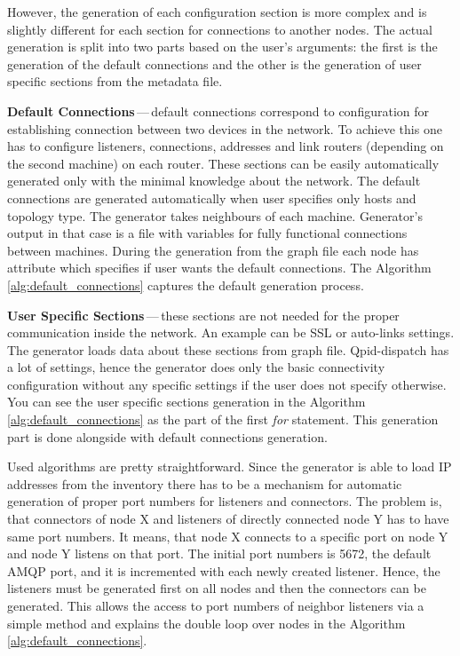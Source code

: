 However, the generation of each configuration section is more complex and is slightly different for each section for connections to another nodes. The actual generation is split into two parts based on the user's arguments: the first is the generation of the default connections and the other is the generation of user specific sections from the metadata file.

\begin{description}
	\item \textbf{Default Connections}\,---\,default connections correspond to configuration for establishing connection between two devices in the network. To achieve this one has to configure listeners, connections, addresses and link routers (depending on the second machine) on each router. These sections can be easily automatically generated only with the minimal knowledge about the network. The default connections are generated automatically when user specifies only hosts and topology type. The generator takes neighbours of each machine. Generator's output in that case is a file with variables for fully functional connections between machines. During the generation from the graph file each node has attribute which specifies if user wants the default connections. The Algorithm \ref{alg:default_connections} captures the default generation process.

	\item \textbf{User Specific Sections}\,---\,these sections are not needed for the proper communication inside the network. An example can be SSL or auto-links settings. The generator loads data about these sections from graph file. Qpid-dispatch has a lot of settings, hence the generator does only the basic connectivity configuration without any specific settings if the user does not specify otherwise. You can see the user specific sections generation in the Algorithm \ref{alg:default_connections} as the part of the first \emph{for} statement. This generation part is done alongside with default connections generation.

\end{description}

Used algorithms are pretty straightforward. Since the generator is able to load IP addresses from the inventory there has to be a mechanism for automatic generation of proper port numbers for listeners and connectors. The problem is, that connectors of node X and listeners of directly connected node Y has to have same port numbers. It means, that node X connects to a specific port on node Y and node Y listens on that port. The initial port numbers is 5672, the default AMQP port, and it is incremented with each newly created listener. Hence, the listeners must be generated first on all nodes and then the connectors can be generated. This allows the access to port numbers of neighbor listeners via a simple method and explains the double loop over nodes in the Algorithm \ref{alg:default_connections}.

